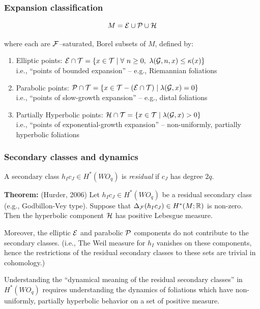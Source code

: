 \documentclass{beamer}
\begin{document}
\frame
{
  \frametitle{Expansion classification}

$$M = {\mathcal E} \cup {\mathcal P} \cup {\mathcal H}$$

where each are ${\mathcal F}$--saturated, Borel subsets of $M$, defined by:

\bigskip

\begin{enumerate}

\pause

\item Elliptic points:  ${\mathcal E} \cap {\mathcal T}  = \{ x \in {\mathcal T} \mid \forall ~ n \geq 0, ~ \lambda({\mathcal G}, n, x) \leq \kappa(x) \}$\\
i.e., ``points of bounded expansion'' -- e.g., Riemannian foliations

 \bigskip
\pause

\item Parabolic  points:  ${\mathcal P} \cap {\mathcal T}  = \{ x \in {\mathcal T} - ( {\mathcal E} \cap {\mathcal T})\mid  \lambda({\mathcal G}, x) = 0 \}$ \\
i.e., ``points of slow-growth expansion'' -- e.g., distal foliations
 
\bigskip
\pause

\item Partially Hyperbolic  points:  ${\mathcal H} \cap {\mathcal T}  = \{ x \in {\mathcal T} \mid  \lambda({\mathcal G}, x) > 0 \}$ \\
 i.e., ``points of exponential-growth expansion'' --  non-uniformly, partially   hyperbolic foliations
 
\end{enumerate}

\vfill
}


   


\frame
{
  \frametitle{Secondary classes and dynamics}

A secondary class  $h_I c_J \in H^*(WO_q)$ is \emph{residual} if $c_J$ has degree $2q$. 

 \bigskip

{\bf Theorem:} (Hurder, 2006) Let $h_I c_J \in H^*(WO_q)$ be a residual secondary class (e.g., Godbillon-Vey type). Suppose that $\Delta_{{\mathcal F}}(h_I c_J) \in H^*(M ; {\mathbb R})$ is non-zero. Then the  hyperbolic component ${\mathcal H}$ has positive Lebesgue measure.
 
 \medskip
 
 Moreover, the elliptic ${\mathcal E}$ and parabolic ${\mathcal P}$ components do not contribute to the secondary classes. (i.e., The Weil measure for $h_I$ vanishes on these components, hence  the restrictions of the residual secondary classes to these sets are trivial in cohomology.)
 
  \bigskip
  \pause
  
 Understanding the ``dynamical meaning of the residual secondary classes'' in $H^*(WO_q)$ requires understanding the dynamics of foliations which have non-uniformly, partially   hyperbolic behavior on a set of positive measure.
  
 
  \vfill
  
}
\end{document}
